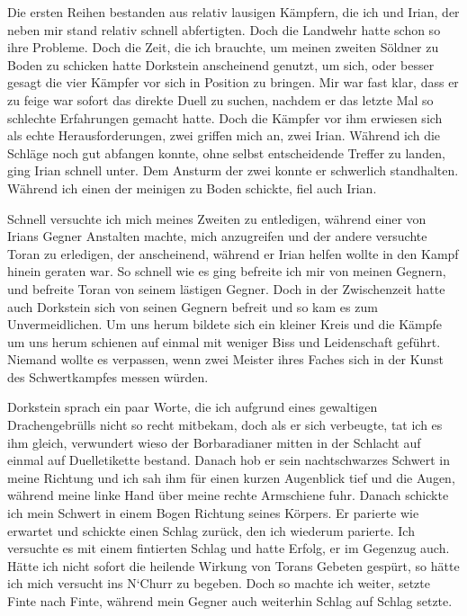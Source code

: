 Die ersten Reihen bestanden aus relativ lausigen Kämpfern, die ich und Irian, der neben mir stand relativ schnell abfertigten. Doch die Landwehr hatte schon so ihre Probleme. Doch die Zeit, die ich brauchte, um meinen zweiten Söldner zu Boden zu schicken hatte Dorkstein anscheinend genutzt, um sich, oder besser gesagt die vier Kämpfer vor sich in Position zu bringen. Mir war fast klar, dass er zu feige war sofort das direkte Duell zu suchen, nachdem er das letzte Mal so schlechte Erfahrungen gemacht hatte. Doch die Kämpfer vor ihm erwiesen sich als echte Herausforderungen, zwei griffen mich an, zwei Irian. Während ich die Schläge noch gut abfangen konnte, ohne selbst entscheidende Treffer zu landen, ging Irian schnell unter. Dem Ansturm der zwei konnte er schwerlich standhalten. Während ich einen der meinigen zu Boden schickte, fiel auch Irian. 

Schnell versuchte ich mich meines Zweiten zu entledigen, während einer von Irians Gegner Anstalten machte, mich anzugreifen und der andere versuchte Toran zu erledigen, der anscheinend, während er Irian helfen wollte in den Kampf hinein geraten war. So schnell wie es ging befreite ich mir von meinen Gegnern, und befreite Toran von seinem lästigen Gegner. Doch in der Zwischenzeit hatte auch Dorkstein sich von seinen Gegnern befreit und so kam es zum Unvermeidlichen. Um uns herum bildete sich ein kleiner Kreis und die Kämpfe um uns herum schienen auf einmal mit weniger Biss und Leidenschaft geführt. Niemand wollte es verpassen, wenn zwei Meister ihres Faches sich in der Kunst des Schwertkampfes messen würden. 

Dorkstein sprach ein paar Worte, die ich aufgrund eines gewaltigen Drachengebrülls nicht so recht mitbekam, doch als er sich verbeugte, tat ich es ihm gleich, verwundert wieso der Borbaradianer mitten in der Schlacht auf einmal auf Duelletikette bestand. Danach hob er sein nachtschwarzes Schwert in meine Richtung und ich sah ihm für einen kurzen Augenblick tief und die Augen, während meine linke Hand über meine rechte Armschiene fuhr. Danach schickte ich mein Schwert in einem Bogen Richtung seines Körpers. Er parierte wie erwartet und schickte einen Schlag zurück, den ich wiederum parierte. Ich versuchte es mit einem fintierten Schlag und hatte Erfolg, er im Gegenzug auch. Hätte ich nicht sofort die heilende Wirkung von Torans Gebeten gespürt, so hätte ich mich versucht ins N`Churr zu begeben. Doch so machte ich weiter, setzte Finte nach Finte, während mein Gegner auch weiterhin Schlag auf Schlag setzte. 

